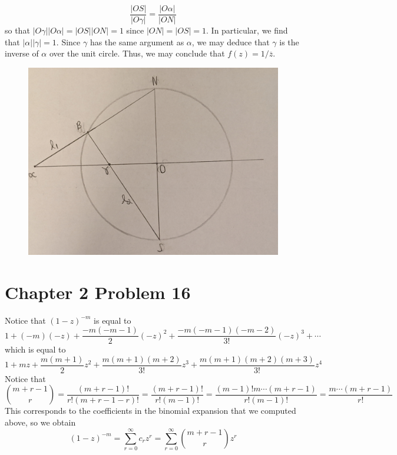 \documentclass[12pt]{article}
\begin{document}
\[
\frac{\vert OS \vert}{\vert O\gamma \vert} = \frac{\vert O\alpha \vert}{\vert ON \vert}
\] so that $\vert O \gamma \vert \vert O \alpha \vert  = \vert OS \vert \vert ON \vert = 1$ since $\vert ON \vert = \vert OS \vert = 1$. In particular, we find that $\vert \alpha \vert \vert \gamma \vert = 1$. Since $\gamma$ has the same argument as $\alpha$, we may deduce that $\gamma$ is the inverse of $\alpha$ over the unit circle. Thus, we may conclude that $f(z) = 1/\overline{z}$.
\begin{figure}[H]
\centering
\includegraphics[width=\textwidth]{Problem5Image1}
\end{figure} 
\newpage
\section*{Chapter 2 Problem 16}
Notice that $(1-z)^{-m}$ is equal to
\[
1 + (-m)(-z) + \frac{-m(-m-1)}{2}(-z)^2 + \frac{-m(-m-1)(-m-2)}{3!}(-z)^3 + \cdots 
\] which is equal to
\[
1 + mz + \frac{m(m+1)}{2}z^2 + \frac{m(m+1)(m+2)}{3!}z^3 +  \frac{m(m+1)(m+2)(m+3)}{3!}z^4  
\] Notice that
\[
\binom{m+r-1}{r} = \frac{(m+r-1)!}{r!(m+r-1-r)!} = \frac{(m+r-1)!}{r!(m-1)!} = \frac{(m-1)!m\cdots (m+r-1)}{r!(m-1)!} = \frac{m \cdots (m+r-1)}{r!}
\] This corresponds to the coefficients in the binomial expansion that we computed above, so we obtain
\[
(1-z)^{-m} = \sum_{r=0}^\infty c_r z^r = \sum_{r = 0}^\infty \binom{m+r-1}{r} z^r
\]
\end{document}
